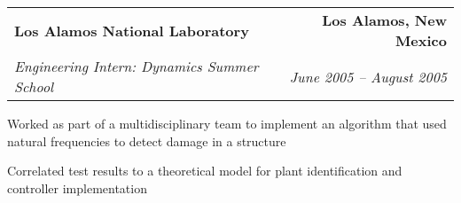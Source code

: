 \begin{tabular*}{6.6in}{@{\extracolsep{\fill}}lr}
\textbf{Los Alamos National Laboratory} & \textbf{Los Alamos, New Mexico}\\
\textit{Engineering Intern: Dynamics Summer School} & \textit{June 2005 -- August 2005}
\end{tabular*}
\begin{compactitem} 
\item Worked as part of a multidisciplinary team to implement an algorithm that used natural frequencies to detect damage in a structure
\item Correlated test results to a theoretical model for plant identification and controller implementation\medskip
\end{compactitem}
